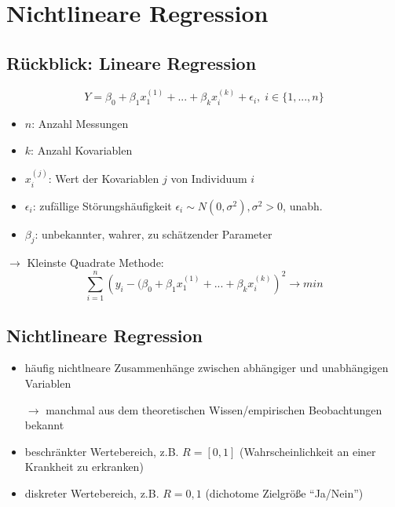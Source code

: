 \documentclass[../VorlesungMaster.tex]{subfiles}
\begin{document}
\section{Nichtlineare Regression}
\subsection{Rückblick: Lineare Regression}
\[ Y= \beta_0 + \beta_1 x_1^{(1)} + ... + \beta_k x_i^{(k)} + \epsilon_i, \; i \in \{1,...,n\} \]
\begin{itemize}
 \item $n$: Anzahl Messungen 
 \item $k$: Anzahl Kovariablen 
 \item $x_i^{(j)}$: Wert der Kovariablen $j$ von Individuum $i$
 \item $\epsilon_i$: zufällige Störungshäufigkeit $\epsilon_i \sim N(0, \sigma^2), \sigma^2 > 0$, unabh.
 \item $\beta_j$: unbekannter, wahrer, zu schätzender Parameter
\end{itemize}
$\rightarrow$ Kleinste Quadrate Methode:
\[ \sum\limits_{i=1}^n \left(y_i - (\beta_0 + \beta_1 x_1^{(1)} + ... + \beta_k x_i^{(k)} \right)^2 \rightarrow min \]

\subsection{Nichtlineare Regression}
\begin{itemize}
 \item häufig nichtlneare Zusammenhänge zwischen abhängiger und unabhängigen Variablen 
	\begin{sloppypar}
	 $\rightarrow$ manchmal aus dem theoretischen Wissen/empirischen Beobachtungen bekannt
	\end{sloppypar}
 \item beschränkter Wertebereich, z.B. $R=[0,1]$ (Wahrscheinlichkeit an einer Krankheit zu erkranken)
 \item diskreter Wertebereich, z.B. $R={0,1}$ (dichotome Zielgröße ``Ja/Nein'')
\end{itemize}

\end{document}
